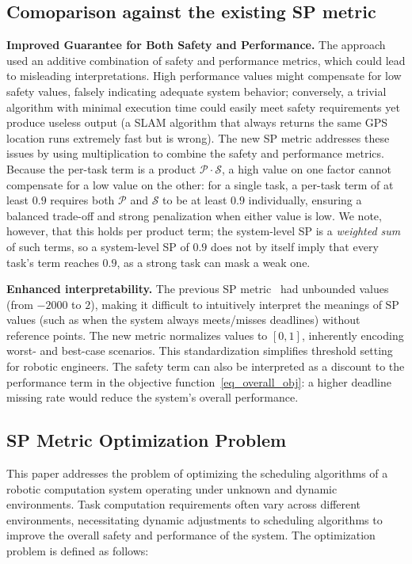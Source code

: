     \subsection{Comoparison against the existing SP metric}
    \textbf{Improved Guarantee for Both Safety and Performance.}
    The approach~\cite{Ash23RAL} used an additive combination of safety and performance metrics, which could lead to misleading interpretations.
    High performance values might compensate for low safety values, falsely indicating adequate system behavior; conversely, a trivial algorithm with minimal execution time could easily meet safety requirements yet produce useless output (\eg a SLAM algorithm that always returns the same GPS location runs extremely fast but is wrong).
    The new SP metric addresses these issues by using multiplication to combine the safety and performance metrics.
    Because the per-task term is a product $\mathcal{P} \cdot \mathcal{S}$, a high value on one factor cannot compensate for a low value on the other: for a single task, a per-task term of at least $0.9$ requires both $\mathcal{P}$ and $\mathcal{S}$ to be at least $0.9$ individually, ensuring a balanced trade-off and strong penalization when either value is low.
    We note, however, that this holds per product term; the system-level SP is a \emph{weighted sum} of such terms, so a system-level SP of $0.9$ does not by itself imply that every task's term reaches $0.9$, as a strong task can mask a weak one.


    \textbf{Enhanced interpretability.}
    The previous SP metric~\cite{Ash23RAL} had unbounded values (\eg from $-2000$ to $2$), making it difficult to intuitively interpret the meanings of SP values (such as when the system always meets/misses deadlines) without reference points.
    The new metric normalizes values to $[0,1]$, inherently encoding worst- and best-case scenarios.
    This standardization simplifies threshold setting for robotic engineers.
    The safety term can also be interpreted as a discount to the performance term in the objective function~\eqref{eq_overall_obj}: a higher deadline missing rate would reduce the system's overall performance.

	\subsection{SP Metric Optimization Problem}
    This paper addresses the problem of optimizing the scheduling algorithms of a robotic computation system operating under unknown and dynamic environments.
    Task computation requirements often vary across different environments, necessitating dynamic adjustments to scheduling algorithms to improve the overall safety and performance of the system.
    The optimization problem is defined as follows:

